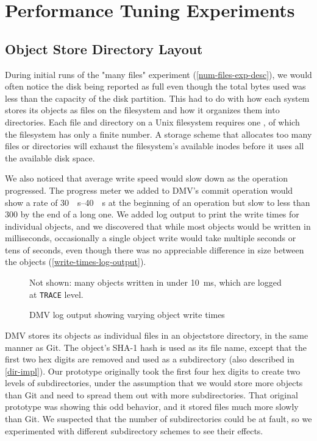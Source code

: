 \chapter{Performance Tuning Experiments}
\label{perf-tuning-exp-chapter}

\section{Object Store Directory Layout}
\label{dir-experiment}

During initial runs of the "many files" experiment
(\autoref{num-files-exp-desc}), we would often notice the disk being reported as
full even though the total bytes used was less than the capacity of the disk
partition. This had to do with how each system stores its objects as files on
the filesystem and how it organizes them into directories. Each file and
directory on a Unix filesystem requires one , of which the
filesystem has only a finite number. A storage scheme that allocates too many
files or directories will exhaust the filesystem's available inodes before it
uses all the available disk space.

We also noticed that average write speed would slow down as the operation
progressed. The progress meter we added to \gls{DMV}'s \gls{commit} operation
would show a rate of \SIrange{30}{40}{\mib\s} at the beginning of an operation
but slow to less than \SI{300}{\kib} by the end of a long one. We added log
output to print the write times for individual objects, and we discovered that
while most objects would be written in milliseconds, occasionally a single
object write would take multiple seconds or tens of seconds, even though there
was no appreciable difference in size between the objects
(\autoref{write-times-log-output}).

\begin{figure}
    \caption{DMV log output showing varying object write times}
    \label{write-times-log-output}
    \centering

    Not shown: many objects written in under \SI{10}{\ms}, which are logged at
    \lstinline{TRACE} level.

    
\end{figure}

\gls{DMV} stores its objects as individual files in an \gls{objectstore}
directory, in the same manner as Git. The object's SHA-1 hash is used as its
file name, except that the first two hex digits are removed and used as a
subdirectory (also described in \autoref{dir-impl}). Our prototype originally
took the first four hex digits to create two levels of subdirectories, under the
assumption that we would store more objects than Git and need to spread them out
with more subdirectories. That original prototype was showing this odd behavior,
and it stored files much more slowly than Git. We suspected that the number of
subdirectories could be at fault, so we experimented with different subdirectory
schemes to see their effects.


